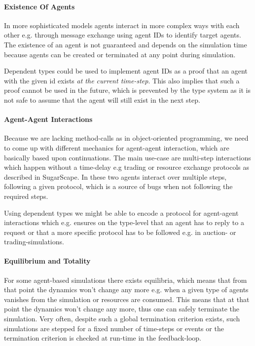 \paragraph{Existence Of Agents}
In more sophisticated models agents interact in more complex ways with each other e.g. through message exchange using agent IDs to identify target agents. The existence of an agent is not guaranteed and depends on the simulation time because agents can be created or terminated at any point during simulation. 

Dependent types could be used to implement agent IDs as a proof that an agent with the given id exists \textit{at the current time-step}. This also implies that such a proof cannot be used in the future, which is prevented by the type system as it is not safe to assume that the agent will still exist in the next step. %

\paragraph{Agent-Agent Interactions}
Because we are lacking method-calls as in object-oriented programming, we need to come up with different mechanics for agent-agent interaction, which are basically based upon continuations. The main use-case are multi-step interactions which happen without a time-delay e.g trading or resource exchange protocols as described in SugarScape. In these two agents interact over multiple steps, following a given protocol, which is a source of bugs when not following the required steps.

Using dependent types we might be able to encode a protocol for agent-agent interactions which e.g. ensures on the type-level that an agent has to reply to a request or that a more specific protocol has to be followed e.g. in auction- or trading-simulations.

\paragraph{Equilibrium and Totality}
For some agent-based simulations there exists equilibria, which means that from that point the dynamics won't change any more e.g. when a given type of agents vanishes from the simulation or resources are consumed. This means that at that point the dynamics won't change any more, thus one can safely terminate the simulation. Very often, despite such a global termination criterion exists, such simulations are stepped for a fixed number of time-steps or events or the termination criterion is checked at run-time in the feedback-loop. 
	
